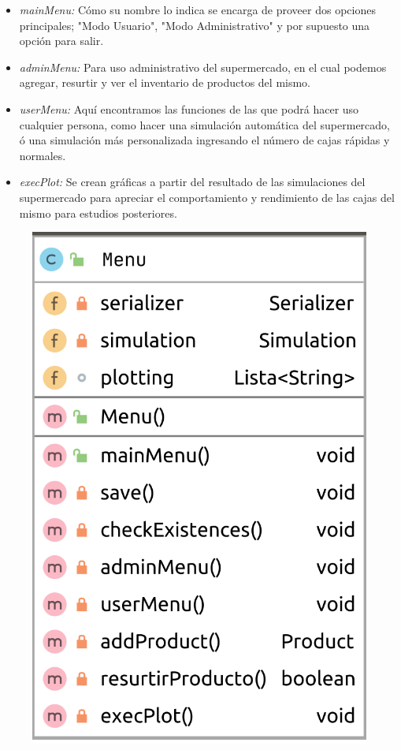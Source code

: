 \documentclass[letterpaper,11pt]{article}
\begin{document}
\begin{itemize}
	\item \textit{mainMenu: } Cómo su nombre lo indica se encarga de proveer dos opciones principales; "Modo Usuario", "Modo Administrativo" y por supuesto una opción para salir.
\end{itemize}
\begin{itemize}
	\item \textit{adminMenu:} Para uso administrativo del supermercado, en el cual podemos agregar, resurtir y ver el inventario de productos del mismo.
\end{itemize}
\begin{itemize}
	\item \textit{userMenu: } Aquí encontramos las funciones de las que podrá hacer uso cualquier persona, como hacer una simulación automática del supermercado, ó una simulación más personalizada ingresando el número de cajas rápidas y normales.
\end{itemize}
\begin{itemize}
	\item \textit{execPlot: } Se crean gráficas a partir del resultado de las simulaciones del supermercado para apreciar el comportamiento y rendimiento de las cajas del mismo para estudios posteriores.
\end{itemize}
\begin{figure}[htb]
	\centering
	\includegraphics[scale=.24]{menu_diagram.png}
\end{figure}
\end{document}
